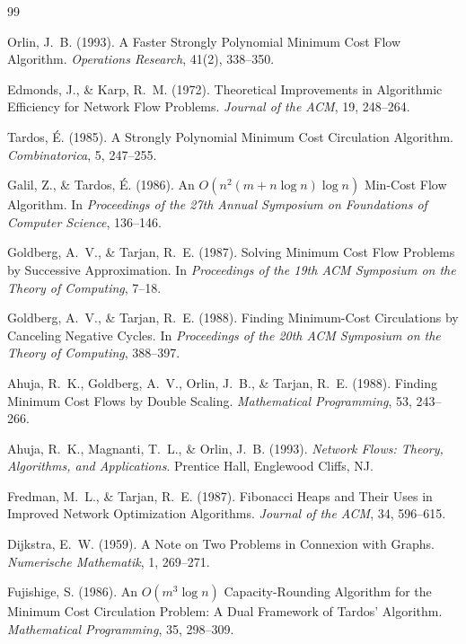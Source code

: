 \documentclass[11pt,a4paper,oneside]{report}
\begin{document}
\begin{thebibliography}{99}
\small

Orlin, J.~B. (1993). A Faster Strongly Polynomial Minimum Cost Flow Algorithm. \textit{Operations Research}, 41(2), 338--350.

Edmonds, J., \& Karp, R.~M. (1972). Theoretical Improvements in Algorithmic Efficiency for Network Flow Problems. \textit{Journal of the ACM}, 19, 248--264.

Tardos, É. (1985). A Strongly Polynomial Minimum Cost Circulation Algorithm. \textit{Combinatorica}, 5, 247--255.

Galil, Z., \& Tardos, É. (1986). An $O(n^2 (m + n \log n) \log n)$ Min-Cost Flow Algorithm. In \textit{Proceedings of the 27th Annual Symposium on Foundations of Computer Science}, 136--146.

Goldberg, A.~V., \& Tarjan, R.~E. (1987). Solving Minimum Cost Flow Problems by Successive Approximation. In \textit{Proceedings of the 19th ACM Symposium on the Theory of Computing}, 7--18.

Goldberg, A.~V., \& Tarjan, R.~E. (1988). Finding Minimum-Cost Circulations by Canceling Negative Cycles. In \textit{Proceedings of the 20th ACM Symposium on the Theory of Computing}, 388--397.

Ahuja, R.~K., Goldberg, A.~V., Orlin, J.~B., \& Tarjan, R.~E. (1988). Finding Minimum Cost Flows by Double Scaling. \textit{Mathematical Programming}, 53, 243--266.

Ahuja, R.~K., Magnanti, T.~L., \& Orlin, J.~B. (1993). \textit{Network Flows: Theory, Algorithms, and Applications}. Prentice Hall, Englewood Cliffs, NJ.

Fredman, M.~L., \& Tarjan, R.~E. (1987). Fibonacci Heaps and Their Uses in Improved Network Optimization Algorithms. \textit{Journal of the ACM}, 34, 596--615.

Dijkstra, E.~W. (1959). A Note on Two Problems in Connexion with Graphs. \textit{Numerische Mathematik}, 1, 269--271.

Fujishige, S. (1986). An $O(m^3 \log n)$ Capacity-Rounding Algorithm for the Minimum Cost Circulation Problem: A Dual Framework of Tardos' Algorithm. \textit{Mathematical Programming}, 35, 298--309.


\end{thebibliography}
\end{document}
